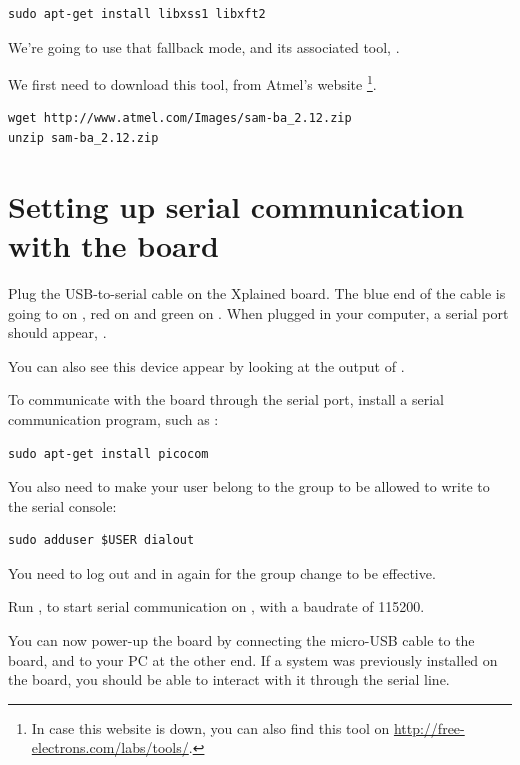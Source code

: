 \begin{verbatim}
sudo apt-get install libxss1 libxft2
\end{verbatim}

We're going to use that fallback mode, and its associated tool,
.

We first need to download this tool, from Atmel's website
\footnote{In case this website is down, you can also find this
tool on \url{http://free-electrons.com/labs/tools/}.}.

\begin{verbatim}
wget http://www.atmel.com/Images/sam-ba_2.12.zip
unzip sam-ba_2.12.zip
\end{verbatim}

\section{Setting up serial communication with the board}

Plug the USB-to-serial cable on the Xplained board. The blue end of
the cable is going to  on , red on  and
green on . When plugged in your computer, a serial port
should appear, .

You can also see this device appear by looking at the output of
.

To communicate with the board through the serial port, install a
serial communication program, such as :

\begin{verbatim}
sudo apt-get install picocom
\end{verbatim}

You also need to make your user belong to the  group to be
allowed to write to the serial console:

\begin{verbatim}
sudo adduser $USER dialout
\end{verbatim}

You need to log out and in again for the group change to be effective.

Run , to start serial
communication on , with a baudrate of 115200.

You can now power-up the board by connecting the micro-USB cable to 
the board, and to your PC at the other end. If a system was previously
installed on the board, you should be able to interact with it
through the serial line.

